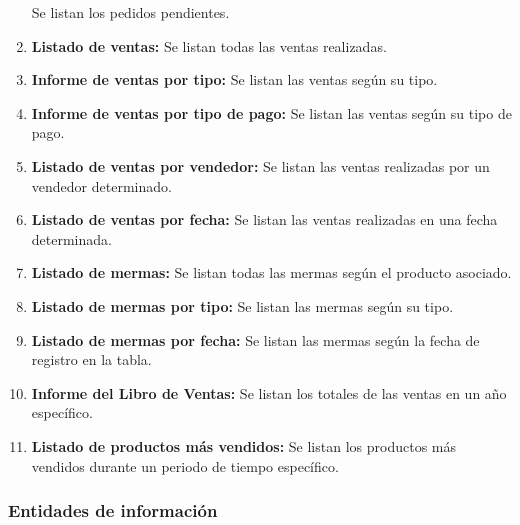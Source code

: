 \documentclass[letterpaper,12pt]{article}
\renewcommand{\labelenumi}{\alph{enumi})}
\begin{document}
\begin{enumerate}
Se listan los pedidos pendientes.
\item \textbf{Listado de ventas:} 
Se listan todas las ventas realizadas.
\item \textbf{Informe de ventas por tipo:} 
Se listan las ventas según su tipo.
\item \textbf{Informe de ventas por tipo de pago:} 
Se listan las ventas según su tipo de pago.
\item \textbf{Listado de ventas por vendedor:} 
Se listan las ventas realizadas por un vendedor determinado.
\item \textbf{Listado de ventas por fecha:} 
Se listan las ventas realizadas en una fecha determinada.
\item \textbf{Listado de mermas:} 
Se listan todas las mermas según el producto asociado.
\item \textbf{Listado de mermas por tipo:} 
Se listan las mermas según su tipo.
\item \textbf{Listado de mermas por fecha:} 
Se listan las mermas según la fecha de registro en la tabla.
\item \textbf{Informe del Libro de Ventas:} 
Se listan los totales de las ventas en un año específico.	
\item \textbf{Listado de productos más vendidos:} 
Se listan los productos más vendidos durante un periodo de tiempo específico.

\end{enumerate}

\renewcommand{\labelenumi}{\alph{enumi})}

\newpage

\subsubsection{Entidades de información}
\end{document}
